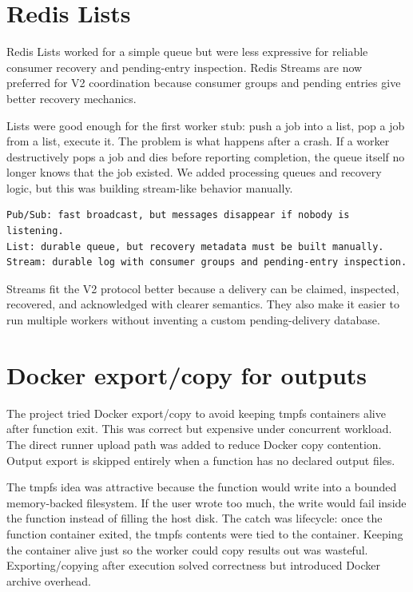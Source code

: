 \documentclass[12pt,a4paper]{report}
\begin{document}
\section{Redis Lists}

Redis Lists worked for a simple queue but were less expressive for reliable
consumer recovery and pending-entry inspection. Redis Streams are now preferred
for V2 coordination because consumer groups and pending entries give better
recovery mechanics.

Lists were good enough for the first worker stub: push a job into a list, pop a
job from a list, execute it. The problem is what happens after a crash. If a
worker destructively pops a job and dies before reporting completion, the queue
itself no longer knows that the job existed. We added processing queues and
recovery logic, but this was building stream-like behavior manually.

\begin{lstlisting}[caption={Why Redis Streams replaced the list-only path.}]
Pub/Sub: fast broadcast, but messages disappear if nobody is listening.
List: durable queue, but recovery metadata must be built manually.
Stream: durable log with consumer groups and pending-entry inspection.
\end{lstlisting}

Streams fit the V2 protocol better because a delivery can be claimed, inspected,
recovered, and acknowledged with clearer semantics. They also make it easier to
run multiple workers without inventing a custom pending-delivery database.

\section{Docker export/copy for outputs}

The project tried Docker export/copy to avoid keeping tmpfs containers alive
after function exit. This was correct but expensive under concurrent workload.
The direct runner upload path was added to reduce Docker copy contention.
Output export is skipped entirely when a function has no declared output files.

The tmpfs idea was attractive because the function would write into a bounded
memory-backed filesystem. If the user wrote too much, the write would fail
inside the function instead of filling the host disk. The catch was lifecycle:
once the function container exited, the tmpfs contents were tied to the
container. Keeping the container alive just so the worker could copy results
out was wasteful. Exporting/copying after execution solved correctness but
introduced Docker archive overhead.
\end{document}

